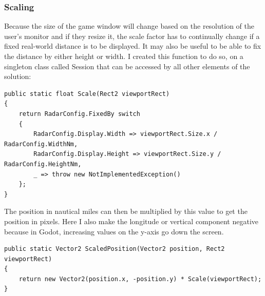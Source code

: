 \documentclass{article}
\begin{document}
\subsubsection{Scaling}
Because the size of the game window will change based on the resolution of the user's monitor and if they resize it, the scale factor has to continually change if a fixed real-world distance is to be displayed.
It may also be useful to be able to fix the distance by either height or width.
I created this function to do so, on a singleton class called Session that can be accessed by all other elements of the solution:
\lstset{style=csharp}
\begin{lstlisting}[label={lst:scalecalc},caption=Function to calculate the scale]
public static float Scale(Rect2 viewportRect)
{
    return RadarConfig.FixedBy switch
    {
        RadarConfig.Display.Width => viewportRect.Size.x / RadarConfig.WidthNm,
        RadarConfig.Display.Height => viewportRect.Size.y / RadarConfig.HeightNm,
        _ => throw new NotImplementedException()
    };
}
\end{lstlisting}
The position in nautical miles can then be multiplied by this value to get the position in pixels.
Here I also make the longitude or vertical component negative because in Godot, increasing values on the y-axis go down the screen.
\begin{lstlisting}[caption=Function to scale a position in nautical miles to the screen]
public static Vector2 ScaledPosition(Vector2 position, Rect2 viewportRect)
{
    return new Vector2(position.x, -position.y) * Scale(viewportRect);
}
\end{lstlisting}
\end{document}
